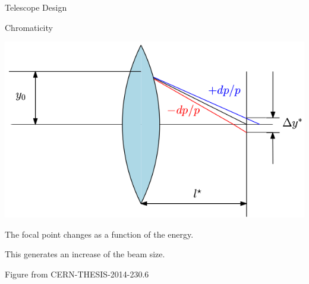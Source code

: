 \documentclass{beamer}
\begin{document}
\begin{frame}
 \color{blue}\Large Telescope Design
\end{frame}
\begin{frame}{Chromaticity}
\begin{center}
 \includegraphics[scale=0.60,angle=0]{chrom.png}
\end{center}
The focal point changes as a function of the energy.\par
This generates an increase of the beam size.\par
{\tiny Figure from CERN-THESIS-2014-230.6}
\end{frame}
\end{document}
